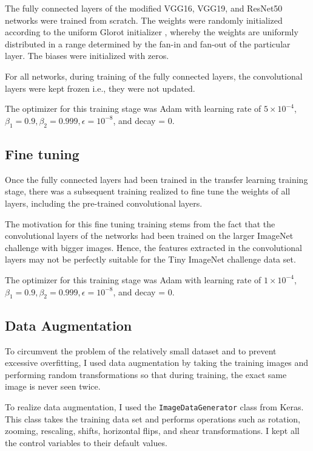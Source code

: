 \documentclass[10pt,twocolumn,letterpaper]{article}
\begin{document}
The fully connected layers of the modified VGG16, VGG19, and ResNet50 networks were trained from scratch. The weights were randomly initialized according to the uniform Glorot initializer \cite{glorot2010}, whereby the weights are uniformly distributed in a range determined by the fan-in and fan-out of the particular layer. The biases were initialized with zeros. 

For all networks, during training of the fully connected layers, the convolutional layers were kept frozen i.e., they were not updated. 

The optimizer for this training stage was Adam with learning rate of $5\times10^{-4}$, $\beta_1 = 0.9, \beta_2 = 0.999, \epsilon=10^{-8}$, and decay = 0.

\subsection{Fine tuning}

Once the fully connected layers had been trained in the transfer learning training stage, there was a subsequent training realized to fine tune the weights of all layers, including the pre-trained convolutional layers.

The motivation for this fine tuning training stems from the fact that the convolutional layers of the networks had been trained on the larger ImageNet challenge with bigger images. Hence, the features extracted in the convolutional layers may not be perfectly suitable for the Tiny ImageNet challenge data set.

The optimizer for this training stage was Adam with learning rate of $1\times10^{-4}$, $\beta_1 = 0.9, \beta_2 = 0.999, \epsilon=10^{-8}$, and decay = 0.

\subsection{Data Augmentation}

To circumvent the problem of the relatively small dataset and to prevent excessive overfitting, I used data augmentation by taking the training images and performing random transformations so that during training, the exact same image is never seen twice. 

To realize data augmentation, I used the \texttt{ImageDataGenerator} class from Keras. This class takes the training data set and performs operations such as rotation, zooming, rescaling, shifts, horizontal flips, and shear transformations. I kept all the control variables to their default values. 
\end{document}
